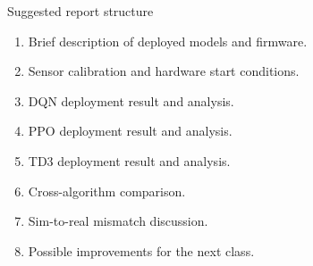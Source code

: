 \documentclass[aspectratio=169]{beamer}
\begin{document}
\begin{frame}{Suggested report structure}

\begin{enumerate}
    \item Brief description of deployed models and firmware.
    \vspace{0.12cm}

    \item Sensor calibration and hardware start conditions.
    \vspace{0.12cm}

    \item DQN deployment result and analysis.
    \vspace{0.12cm}

    \item PPO deployment result and analysis.
    \vspace{0.12cm}

    \item TD3 deployment result and analysis.
    \vspace{0.12cm}

    \item Cross-algorithm comparison.
    \vspace{0.12cm}

    \item Sim-to-real mismatch discussion.
    \vspace{0.12cm}

    \item Possible improvements for the next class.
\end{enumerate}

\end{frame}
\end{document}
